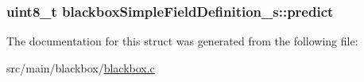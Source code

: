 \hypertarget{structblackboxSimpleFieldDefinition__s_a1fa810242c7c545c0abc8082b75cad9b}{
\subsubsection[{predict}]{\setlength{\rightskip}{0pt plus 5cm}uint8\+\_\+t blackbox\+Simple\+Field\+Definition\+\_\+s\+::predict}}\label{structblackboxSimpleFieldDefinition__s_a1fa810242c7c545c0abc8082b75cad9b}


The documentation for this struct was generated from the following file\+:\begin{DoxyCompactItemize}
\item 
src/main/blackbox/\hyperlink{blackbox_8c}{blackbox.\+c}\end{DoxyCompactItemize}

